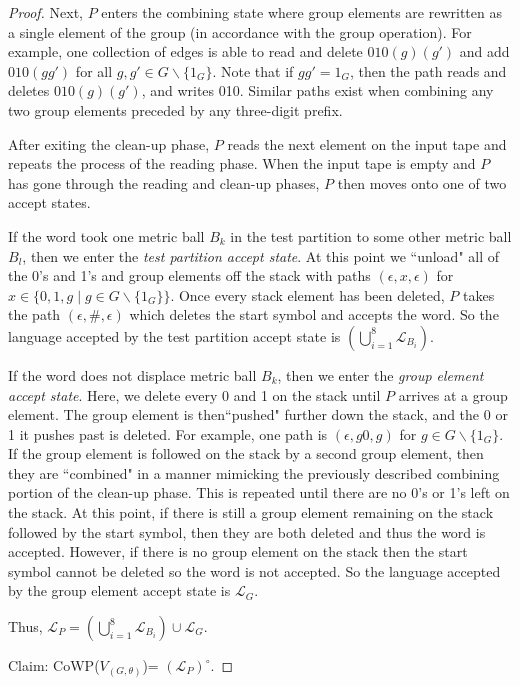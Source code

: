 \documentclass[11pt]{amsart}
\theoremstyle{plain}
\theoremstyle{remark}
\theoremstyle{definition}
\theoremstyle{remark}
\theoremstyle{named}
\begin{document}
\begin{proof}
Next, $P$ enters the combining state where group elements are rewritten as a single element of the group (in accordance with the group operation). For example, one collection of edges is able to read and delete $010(g)(g')$ and add $010(gg')$ for all $g, g' \in G \backslash \{1_G\}$. Note that if $gg'=1_G$, then the path reads and deletes $010(g)(g')$, and writes 010. Similar paths exist when combining any two group elements preceded by any three-digit prefix.

After exiting the clean-up phase, $P$ reads the next element on the input tape and repeats the process of the reading phase. When the input tape is empty and $P$ has gone through the reading and clean-up phases, $P$ then moves onto one of two accept states.

If the word took one metric ball $B_k$ in the test partition to some other metric ball $B_l$, then we enter the \emph{test partition accept state}. At this point we ``unload" all of the 0's and 1's and group elements off the stack with paths $(\epsilon,x,\epsilon)$ for $x \in \{0, 1, g \mid g \in G\backslash \{1_G\}\}$. Once every stack element has been deleted, $P$ takes the path $(\epsilon,\#,\epsilon)$ which deletes the start symbol and accepts the word. So the language accepted by the test partition accept state is $(\mathop{\bigcup}_{i=1}^8 \mathcal{L}_{B_i})$.

If the word does not displace metric ball $B_k$, then we enter the \emph{group element accept state}. Here, we delete every 0 and 1 on the stack until $P$ arrives at a group element. The group element is then``pushed" further down the stack, and the 0 or 1 it pushes past is deleted.  For example, one path is $(\epsilon, g0, g)$ for $g \in G \backslash \{1_G\}$. If the group element is followed on the stack by a second group element, then they are ``combined" in a manner mimicking the previously described combining portion of the clean-up phase. This is repeated until there are no 0's or 1's left on the stack. At this point, if there is still a group element remaining on the stack followed by the start symbol, then they are both deleted and thus the word is accepted. However, if there is no group element on the stack then the start symbol cannot be deleted so the word is not accepted. So the language accepted by the group element accept state is $\mathcal{L}_G$. 

Thus, $\mathcal{L}_P = (\mathop{\bigcup}_{i=1}^8 \mathcal{L}_{B_i}) \cup \mathcal{L}_G $.

Claim: CoWP($V_{(G, \theta)}$)= $(\mathcal{L}_P)^{\circ}$.


\end{proof}
\end{document}
